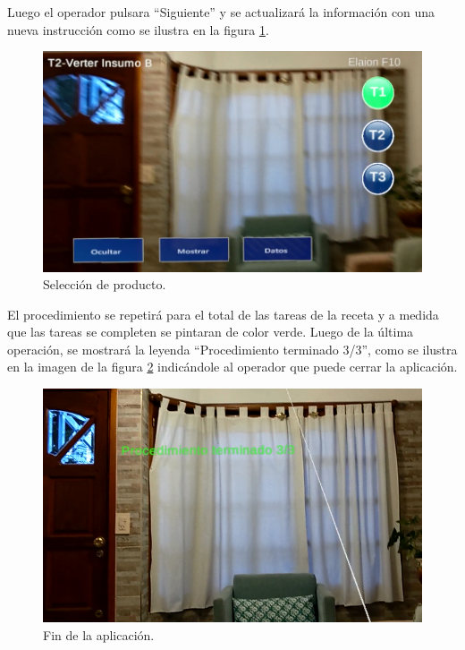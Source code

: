 Luego el operador pulsara ``Siguiente'' y se actualizará la información con una nueva instrucción como se ilustra en la figura \ref{fig:i11}.

\begin{figure}[!htpb]
	\centering
	\includegraphics[scale=.5]{./Figures/i11.PNG}
	\caption{Selección de producto\protect\footnotemark.}
	\label{fig:i11}
\end{figure}

El procedimiento se repetirá para el total de las tareas de la receta y a medida que las tareas se completen se pintaran de color verde. Luego de la última operación, se mostrará la leyenda ``Procedimiento terminado 3/3'', como se ilustra en la imagen de la figura \ref{fig:i18} indicándole al operador que puede cerrar la aplicación.

\begin{figure}[!htpb]
	\centering
	\includegraphics[scale=.5]{./Figures/i18.PNG}
	\caption{Fin de la aplicación\protect\footnotemark.}
	\label{fig:i18}
\end{figure} 

